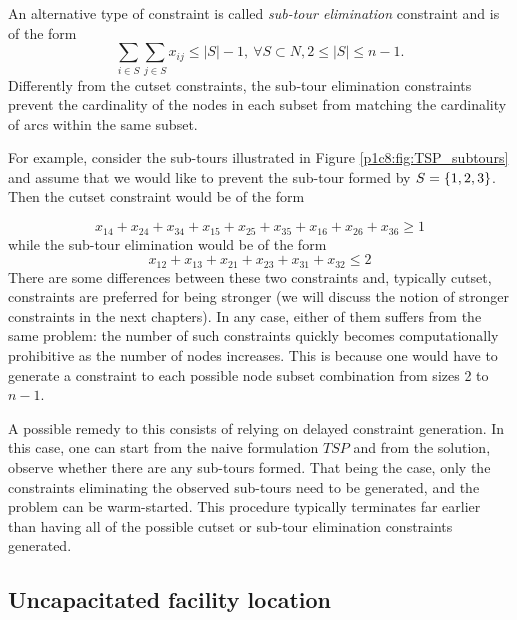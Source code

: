 An alternative type of constraint is called \emph{sub-tour elimination} constraint and is of the form
%
\begin{equation*}
	\sum_{i \in S}\sum_{j \in S}x_{ij} \leq |S|-1, \ \forall S \subset N, 2 \leq |S| \leq n-1. 
\end{equation*}
%
Differently from the cutset constraints, the sub-tour elimination constraints prevent the cardinality of the nodes in each subset from matching the cardinality of arcs within the same subset.

For example, consider the sub-tours illustrated in Figure \ref{p1c8:fig:TSP_subtours} and assume that we would like to prevent the sub-tour formed by $S = \left\{ 1,2,3 \right \}$. Then the cutset constraint would be of the form

\begin{equation*}
	x_{14} + x_{24} + x_{34} + x_{15} + x_{25} + x_{35} + x_{16} + x_{26} + x_{36}\geq 1	
\end{equation*}
%
while the sub-tour elimination would be of the form
\begin{equation*}
	x_{12} + x_{13} + x_{21} + x_{23} + x_{31} + x_{32} \leq 2
\end{equation*}
%
There are some differences between these two constraints and, typically cutset, constraints are preferred for being stronger (we will discuss the notion of stronger constraints in the next chapters). In any case, either of them suffers from the same problem: the number of such constraints quickly becomes computationally prohibitive as the number of nodes increases. This is because one would have to generate a constraint to each possible node subset combination from sizes 2 to $n-1$. 

A possible remedy to this consists of relying on delayed constraint generation. In this case, one can start from the naive formulation $TSP$ and from the solution, observe whether there are any sub-tours formed. That being the case, only the constraints eliminating the observed sub-tours need to be generated, and the problem can be warm-started. This procedure typically terminates far earlier than having all of the possible cutset or sub-tour elimination constraints generated. 


\subsection{Uncapacitated facility location}

